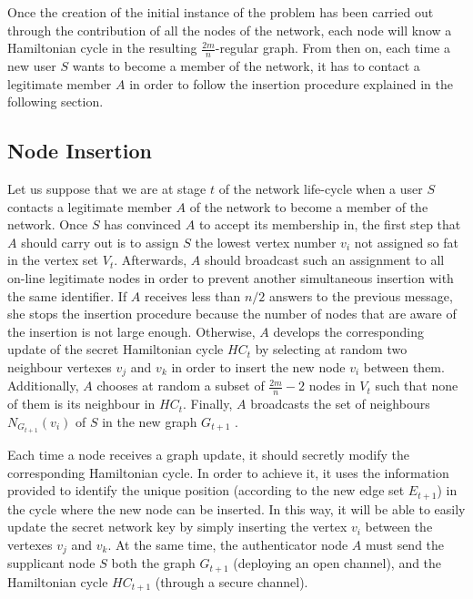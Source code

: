 \documentclass[conference]{IEEEtran}
\begin{document}
Once the creation of the initial instance of the problem has
been carried out through the contribution of all the nodes
of the network, each node will know a Hamiltonian
cycle in the resulting $\frac{2m}{n}$-regular graph. From then on,
each time a new user $S$ wants to become a member of the network,
it has to contact a legitimate member $A$ in order to follow the
insertion procedure explained in the following section.

\subsection{Node Insertion}


Let us suppose that we are at  stage $t$ of the network life-cycle
when a user $S$ contacts a legitimate member $A$ of the network to
become a member of the network. Once $S$ has convinced $A$ to
accept its membership in, the first step that $A$ should
carry out is to assign $S$ the lowest vertex number $v_i$ not assigned
so fat in the vertex set $V_t$. Afterwards, $A$ should
broadcast such an assignment to all on-line legitimate nodes in order to prevent another simultaneous insertion with the same identifier. If $A$ receives
less than $n/2$ answers to the previous message, she stops the insertion procedure because
the number of nodes that are aware of the insertion is not large
enough. Otherwise, $A$ develops the corresponding update of the
secret Hamiltonian cycle $HC_t$ by selecting at random two
neighbour vertexes $v_j$ and $v_k$ in order to insert the new node
$v_i$ between them. Additionally, $A$ chooses at random a subset of $\frac{2m}{n} -2$
nodes in $V_t$ such that none of them is its neighbour in $HC_t$. Finally, $A$ broadcasts the set of neighbours $N_{G_{t+1}}(v_i)$ of $S$ in
the new graph $G_{t+1}$ .

Each time a node receives a graph update, it should secretly modify the corresponding Hamiltonian cycle. In order to achieve it, it uses the information provided to identify the unique position (according to the new edge set $E_{t+1}$) in the cycle where the new node can be inserted. In this way, it will be able to easily update the secret network key by simply inserting the vertex $v_i$ between the vertexes $v_j$ and $v_k$. At the same time, the
authenticator node $A$ must send the supplicant node $S$ both the graph $G_{t+1}$ (deploying an open channel), and  the Hamiltonian cycle $HC_{t+1}$ (through a secure channel).
\end{document}
